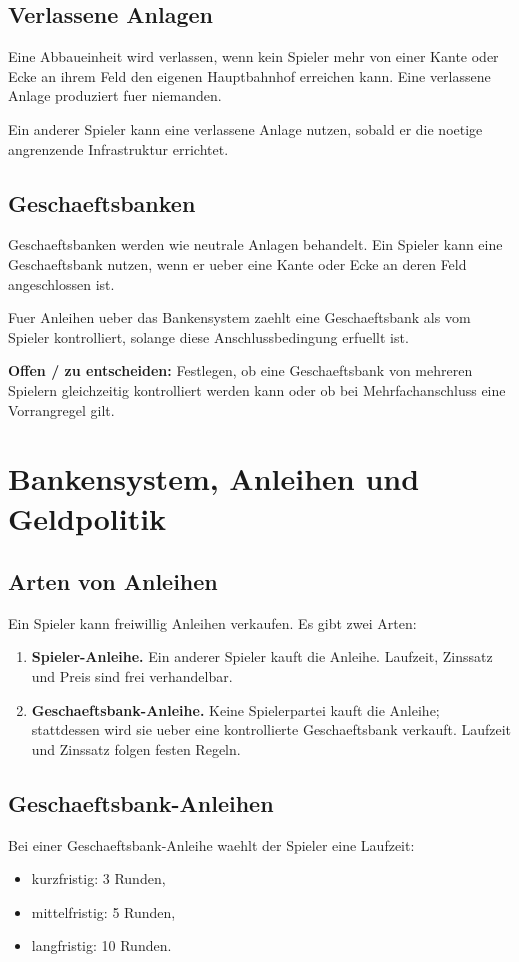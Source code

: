 \documentclass[11pt,a4paper,oneside,parskip=half]{scrreprt}
\newcommand{\begriff}[1]{\textbf{#1}}
\newcommand{\offen}[1]{\begin{framed}\noindent\textbf{Offen / zu entscheiden:} #1\end{framed}}
\begin{document}
\section{Verlassene Anlagen}
Eine Abbaueinheit wird verlassen, wenn kein Spieler mehr von einer Kante oder Ecke
an ihrem Feld den eigenen Hauptbahnhof erreichen kann. Eine verlassene Anlage
produziert fuer niemanden.

Ein anderer Spieler kann eine verlassene Anlage nutzen, sobald er die noetige angrenzende Infrastruktur errichtet.

\section{Geschaeftsbanken}
Geschaeftsbanken werden wie neutrale Anlagen behandelt. Ein Spieler kann eine Geschaeftsbank nutzen, wenn er ueber eine Kante oder Ecke an deren Feld angeschlossen ist.

Fuer Anleihen ueber das Bankensystem zaehlt eine Geschaeftsbank als vom Spieler kontrolliert, solange diese Anschlussbedingung erfuellt ist.

\offen{Festlegen, ob eine Geschaeftsbank von mehreren Spielern gleichzeitig kontrolliert werden kann oder ob bei Mehrfachanschluss eine Vorrangregel gilt.}

\chapter{Bankensystem, Anleihen und Geldpolitik}

\section{Arten von Anleihen}
Ein Spieler kann freiwillig Anleihen verkaufen. Es gibt zwei Arten:
\begin{enumerate}
  \item \begriff{Spieler-Anleihe.} Ein anderer Spieler kauft die Anleihe. Laufzeit, Zinssatz und Preis sind frei verhandelbar.
  \item \begriff{Geschaeftsbank-Anleihe.} Keine Spielerpartei kauft die Anleihe; stattdessen wird sie ueber eine kontrollierte Geschaeftsbank verkauft. Laufzeit und Zinssatz folgen festen Regeln.
\end{enumerate}

\section{Geschaeftsbank-Anleihen}
Bei einer Geschaeftsbank-Anleihe waehlt der Spieler eine Laufzeit:
\begin{itemize}
  \item kurzfristig: 3 Runden,
  \item mittelfristig: 5 Runden,
  \item langfristig: 10 Runden.
\end{itemize}
\end{document}

